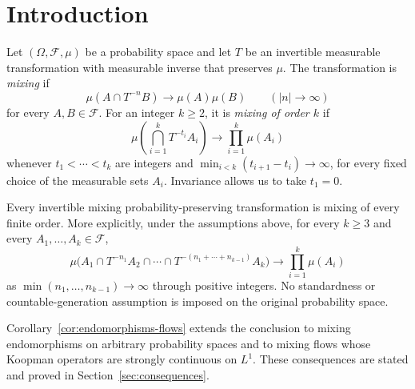\begin{abstract}
Every invertible mixing probability-preserving transformation is mixing of every finite order. Thus Rokhlin's multiple-mixing problem for a single transformation has an affirmative answer.
\end{abstract}
\section{Introduction}
\label{sec:introduction}

Let $(\Omega,\mathcal F,\mu)$ be a probability space and let $T$ be an
invertible measurable transformation with measurable inverse that preserves
$\mu$. The transformation is \emph{mixing} if
\[
 \mu(A\cap T^{-n}B)\longrightarrow\mu(A)\mu(B)
 \qquad(|n|\to\infty)
\]
for every $A,B\in\mathcal F$. For an integer $k\ge2$, it is
\emph{mixing of order $k$} if
\[
 \mu\left(\bigcap_{i=1}^k T^{-t_i}A_i\right)
 \longrightarrow\prod_{i=1}^k\mu(A_i)
\]
whenever $t_1<\cdots<t_k$ are integers and
$\min_{i<k}(t_{i+1}-t_i)\to\infty$, for every fixed choice of the
measurable sets $A_i$. Invariance allows us to take $t_1=0$.

\begin{theorem}
\label{thm:main}
Every invertible mixing probability-preserving transformation is mixing
of every finite order. More explicitly, under the assumptions above, for
every $k\ge3$ and every $A_1,\ldots,A_k\in\mathcal F$,
\[
 \mu\bigl(A_1\cap T^{-n_1}A_2\cap\cdots\cap
             T^{-(n_1+\cdots+n_{k-1})}A_k\bigr)
 \longrightarrow\prod_{i=1}^k\mu(A_i)
\]
as $\min(n_1,\ldots,n_{k-1})\to\infty$ through positive integers.
No standardness or countable-generation assumption is imposed on the
original probability space.
\end{theorem}

Corollary~\ref{cor:endomorphisms-flows} extends the conclusion to mixing
endomorphisms on arbitrary probability spaces and to mixing flows whose
Koopman operators are strongly continuous on $L^1$. These consequences
are stated and proved in Section~\ref{sec:consequences}.

